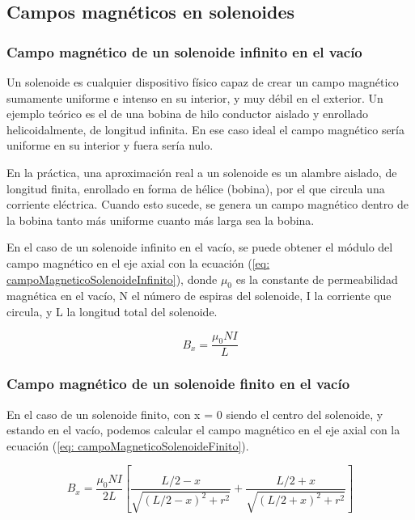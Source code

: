 \documentclass[a4paper,12pt]{article}
\begin{document}
    \subsection*{Campos magnéticos en solenoides}

    \subsubsection*{Campo magnético de un solenoide infinito en el vacío}

        Un solenoide es cualquier dispositivo físico capaz de crear un campo magnético sumamente uniforme e intenso en su interior, y muy débil en el exterior. Un ejemplo teórico es el de una bobina de hilo conductor aislado y enrollado helicoidalmente, de longitud infinita. En ese caso ideal el campo magnético sería uniforme en su interior y fuera sería nulo.

        En la práctica, una aproximación real a un solenoide es un alambre aislado, de longitud finita, enrollado en forma de hélice (bobina), por el que circula una corriente eléctrica. Cuando esto sucede, se genera un campo magnético dentro de la bobina tanto más uniforme cuanto más larga sea la bobina.

        En el caso de un solenoide infinito en el vacío, se puede obtener el módulo del campo magnético en el eje axial con la ecuación (\ref{eq: campoMagneticoSolenoideInfinito}), donde $\mu_0$ es la constante de permeabilidad magnética en el vacío, N el número de espiras del solenoide, I la corriente que circula, y L la longitud total del solenoide.

        \begin{equation}
            \label{eq: campoMagneticoSolenoideInfinito}
            B_x = \frac{\mu_0 N I}{L}
        \end{equation}

    \subsubsection*{Campo magnético de un solenoide finito en el vacío}
    
        En el caso de un solenoide finito, con x = 0 siendo el centro del solenoide, y estando en el vacío, podemos calcular el campo magnético en el eje axial con la ecuación (\ref{eq: campoMagneticoSolenoideFinito}).

        \begin{equation}
            \label{eq: campoMagneticoSolenoideFinito}
            B_x = \frac{\mu_0 N I}{2L} \left[ \frac{L/2 - x}{\sqrt{(L/2 - x)^2 + r^2}} + \frac{L/2 + x}{\sqrt{(L/2 + x)^2 + r^2}} \right]
        \end{equation}
\end{document}
